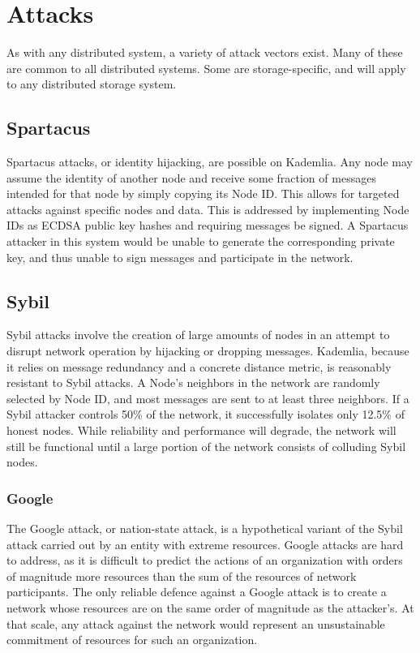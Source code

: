 \documentclass[a4paper,10pt]{article}
\begin{document}
\section{Attacks}
As with any distributed system, a variety of attack vectors exist. Many of these are common to all distributed systems. Some are storage-specific, and will apply to any distributed storage system.

\subsection{Spartacus}
Spartacus attacks, or identity hijacking, are possible on Kademlia. Any node may assume the identity of another node and receive some fraction of messages intended for that node by simply copying its Node ID. This allows for targeted attacks against specific nodes and data. This is addressed by implementing Node IDs as ECDSA public key hashes and requiring messages be signed. A Spartacus attacker in this system would be unable to generate the corresponding private key, and thus unable to sign messages and participate in the network.

\subsection{Sybil}

Sybil attacks involve the creation of large amounts of nodes in an attempt to disrupt network operation by hijacking or dropping messages. Kademlia, because it relies on message redundancy and a concrete distance metric, is reasonably resistant to Sybil attacks. A Node’s neighbors in the network are randomly selected by Node ID, and most messages are sent to at least three neighbors. If a Sybil attacker controls 50\% of the network, it successfully isolates only 12.5\% of honest nodes. While reliability and performance will degrade, the network will still be functional until a large portion of the network consists of colluding Sybil nodes.

\subsubsection{Google}
The Google attack, or nation-state attack, is a hypothetical variant of the Sybil attack carried out by an entity with extreme resources. Google attacks are hard to address, as it is difficult to predict the actions of an organization with orders of magnitude more resources than the sum of the resources of network participants. The only reliable defence against a Google attack is to create a network whose resources are on the same order of magnitude as the attacker’s. At that scale, any attack against the network would represent an unsustainable commitment of resources for such an organization.
\end{document}
